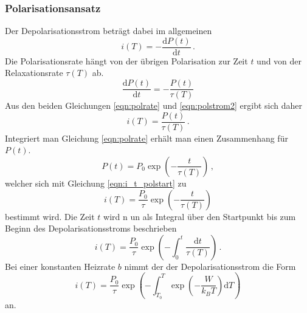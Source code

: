 \subsubsection{Polarisationsansatz}
Der Depolarisationsstrom beträgt dabei im allgemeinen
\begin{equation}
    i(T) = -\frac{\mathrm{d}P(t)}{\mathrm{d}t}\,.
    \label{eqn:polstrom2}
\end{equation}
Die Polarisationsrate hängt von der übrigen Polarisation zur Zeit $t$
und von der Relaxationsrate $\tau(T)$ ab.
\begin{equation}
    \frac{\text{d}{P(t)}}{\text{d}{t}} = -\frac{P(t)}{\tau(T)}
    \label{eqn:polrate}
\end{equation}
Aus den beiden Gleichungen \eqref{eqn:polrate} und \eqref{eqn:polstrom2} ergibt sich daher
\begin{equation}
    i(T) = \frac{P(t)}{\tau(T)}\,.
    \label{eqn:i_t_polstart}
\end{equation}
Integriert man Gleichung \eqref{eqn:polrate} erhält man einen Zusammenhang für $P(t)$.
\begin{equation}
    P(t) = P_{0} \exp\!\left(-\frac{t}{\tau(T)}\right)\,,
\end{equation}
welcher sich mit Gleichung \eqref{eqn:i_t_polstart} zu
\begin{equation}
    i(T) = \frac{P_0}{\tau} \exp\!\left(-\frac{t}{\tau(T)}\right) 
\end{equation}
bestimmt wird.
Die Zeit $t$ wird n un als Integral über den Startpunkt bis zum Beginn des Depolarisationsstroms beschrieben
\begin{equation}
    i(T) = \frac{P_{0}}{\tau} \exp\!\left(-\int_0^t \frac{\text{d}{t}}{\tau(T)}\right)\,.
\end{equation}
Bei einer konstanten Heizrate $b$ nimmt der der Depolarisationsstrom die Form
\begin{equation}
    i(T) = \frac{P_0}{\tau} \exp\!\left(-\int_{T_0}^T
      \exp\!\left(- \frac{W}{k_B T}\right) \text{d}{T}\right)
    \label{eq:final}
\end{equation}
an.

